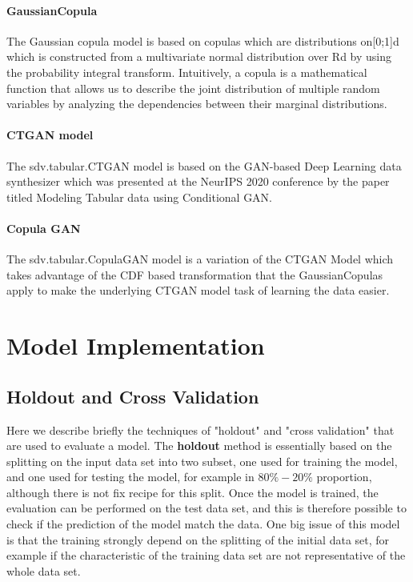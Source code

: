 \documentclass{article}
\begin{document}
\paragraph{GaussianCopula}
The Gaussian copula model is based on copulas which are distributions on[0;1]d which is constructed from a multivariate normal distribution over Rd by using the probability integral transform. Intuitively, a copula is a mathematical function that allows us to describe the joint distribution of multiple random variables by analyzing the dependencies between their marginal distributions.

\paragraph{CTGAN model}
The sdv.tabular.CTGAN model is based on the GAN-based Deep Learning data synthesizer which was presented at the NeurIPS 2020 conference by the paper titled Modeling Tabular data using Conditional GAN.
\paragraph{Copula GAN}
The sdv.tabular.CopulaGAN model is a variation of the CTGAN Model which takes advantage of the CDF based transformation that the GaussianCopulas apply to make the underlying CTGAN model task of learning the data easier.

\section{Model Implementation}

\subsection{Holdout and Cross Validation}
Here we describe briefly the techniques of "holdout" and "cross validation" that are used to evaluate a model. The \textbf{holdout} method is essentially based on the splitting on the input data set into two subset, one used for training the model, and one used for testing the model, for example in $80\%-20\%$ proportion, although there is not fix recipe for this split. Once the model is trained, the evaluation can be performed on the test data set, and this is therefore possible to check if the prediction of the model match the data. One big issue of this model is that the training strongly depend on the splitting of the initial data set, for example if the characteristic of the training data set are not representative of the whole data set. 
\end{document}
